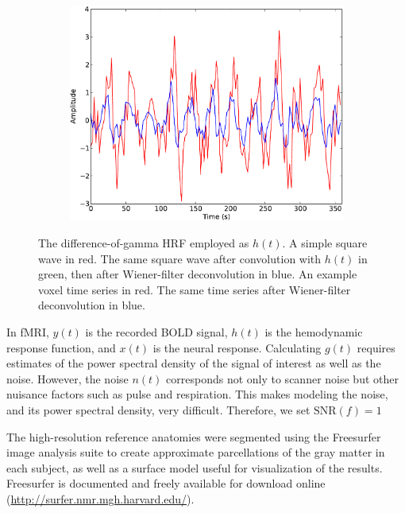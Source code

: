 \documentclass[preprint,5p,authoryear]{elsarticle}
\begin{document}
\begin{figure}
\begin{subfigure}{0.3\textwidth}
\includegraphics[width=\textwidth]{figures/voxel-wiener-deconvolution}
\caption{}
\label{fig:wiener-voxel}
\end{subfigure}
\caption{
 The difference-of-gamma HRF employed as $h(t)$. 
 A simple square wave in red. 
The same square wave after convolution with $h(t)$ in green, then after Wiener-filter deconvolution in blue. 
 An example voxel time series in red. 
The same time series after Wiener-filter deconvolution in blue.}
\label{fig:wiener-deconvolution}
\end{figure}

In fMRI, $y(t)$ is the recorded BOLD signal, $h(t)$ is the hemodynamic response function, and $x(t)$ is the neural response.
Calculating $g(t)$ requires estimates of the power spectral density of the signal of interest as well as the noise.
However, the noise $n(t)$ corresponds not only to scanner noise but other nuisance factors such as pulse and respiration.
This makes modeling the noise, and its power spectral density, very difficult.
Therefore, we set $\mbox{SNR}(f) = 1$%

The high-resolution reference anatomies were segmented using the Freesurfer image analysis suite to create approximate parcellations of the gray matter in each subject, as well as a surface model useful for visualization of the results.
Freesurfer is documented and freely available for download online (\url{http://surfer.nmr.mgh.harvard.edu/}).
\end{document}
